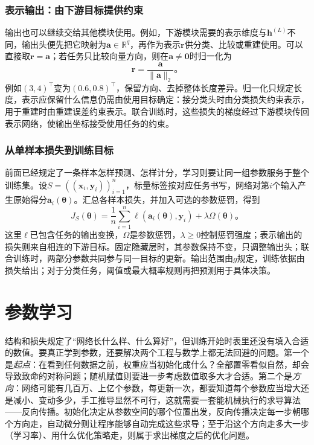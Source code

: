 \subsubsection{表示输出：由下游目标提供约束}
\label{sec:ffn-output-representation}

输出也可以继续交给其他模块使用。例如，下游模块需要的表示维度与$\bm h^{(L)}$不同，输出头便先把它映射为$\bm a\in\mathbb R^q$，再作为表示$\bm r$供分类、比较或重建使用。可以直接取$\bm r=\bm a$；若任务只比较向量方向，则在$\bm a\neq\bm0$时归一化为
\begin{equation}
  \bm{r}=\frac{\bm{a}}{\lVert\bm{a}\rVert_2}\text{。}
  \label{eq:ffn-normalized-representation}
\end{equation}
例如$(3,4)^{\top}$变为$(0.6,0.8)^{\top}$，保留方向、去掉整体长度差异。归一化只规定长度，表示应保留什么信息仍需由使用目标确定：接分类头时由分类损失约束表示，用于重建时由重建误差约束表示。联合训练时，这些损失的梯度经过下游模块传回表示网络，使输出坐标接受使用任务的约束。

\subsubsection{从单样本损失到训练目标}
\label{sec:ffn-empirical-objective}

前面已经规定了一条样本怎样预测、怎样计分，学习则要让同一组参数服务于整个训练集。设$S=((\bm x_i,\bm y_i))_{i=1}^{n}$，标量标签按对应任务书写，网络对第$i$个输入产生原始得分$\bm a_i(\bm\theta)$。汇总各样本损失，并加入可选的参数惩罚，得到
\begin{equation}
  J_S(\bm{\theta})=
  \frac1n\sum_{i=1}^{n}\ell\!\left(\bm{a}_i(\bm{\theta}),\bm{y}_i\right)
  +\lambda\Omega(\bm{\theta})\text{。}
  \label{eq:ffn-training-objective}
\end{equation}
这里$\ell$已包含任务的输出变换，$\Omega$是参数惩罚，$\lambda\geq0$控制惩罚强度；表示输出的损失则来自相连的下游目标。固定隐藏层时，其参数保持不变，只调整输出头；联合训练时，两部分参数共同参与同一目标的更新。输出范围由$g$规定，训练依据由损失给出；对于分类任务，阈值或最大概率规则再把预测用于具体决策。

\section{参数学习}
\label{sec:ffn-learning}

结构和损失规定了“网络长什么样、什么算好”，但训练开始时表里还没有填入合适的数值。要真正学到参数，还要解决两个工程与数学上都无法回避的问题。第一个是\emph{起点}：在看到任何数据之前，权重应当初始化成什么？全部置零看似自然，却会导致致命的对称问题；随机赋值则要进一步考虑数值取多大才合适。第二个是\emph{方向}：网络可能有几百万、上亿个参数，每更新一次，都要知道每个参数应当增大还是减小、变动多少，手工推导显然不可行，这就需要一套能机械执行的求导算法——反向传播。初始化决定从参数空间的哪个位置出发，反向传播决定每一步朝哪个方向走，自动微分则让程序能够自动完成这些求导；至于沿这个方向走多大一步（学习率）、用什么优化策略走，则属于求出梯度之后的优化问题。

